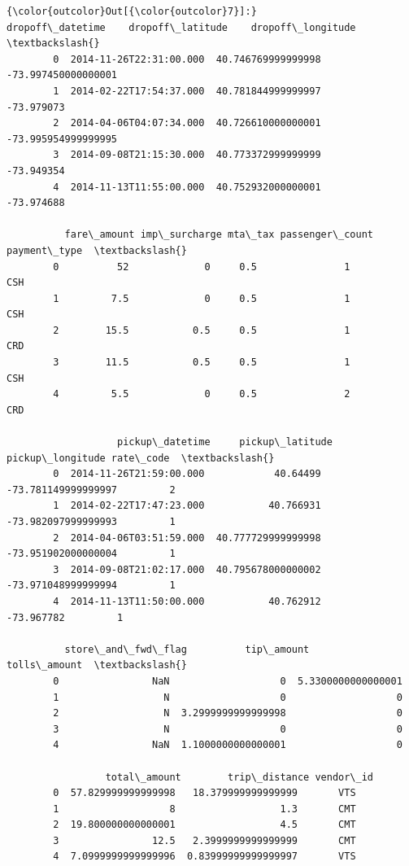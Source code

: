 \documentclass[11pt]{article}
\begin{document}
\begin{Verbatim}[commandchars=\\\{\}]
{\color{outcolor}Out[{\color{outcolor}7}]:}           dropoff\_datetime    dropoff\_latitude    dropoff\_longitude  \textbackslash{}
        0  2014-11-26T22:31:00.000  40.746769999999998  -73.997450000000001   
        1  2014-02-22T17:54:37.000  40.781844999999997           -73.979073   
        2  2014-04-06T04:07:34.000  40.726610000000001  -73.995954999999995   
        3  2014-09-08T21:15:30.000  40.773372999999999           -73.949354   
        4  2014-11-13T11:55:00.000  40.752932000000001           -73.974688   
        
          fare\_amount imp\_surcharge mta\_tax passenger\_count payment\_type  \textbackslash{}
        0          52             0     0.5               1          CSH   
        1         7.5             0     0.5               1          CSH   
        2        15.5           0.5     0.5               1          CRD   
        3        11.5           0.5     0.5               1          CSH   
        4         5.5             0     0.5               2          CRD   
        
                   pickup\_datetime     pickup\_latitude     pickup\_longitude rate\_code  \textbackslash{}
        0  2014-11-26T21:59:00.000            40.64499  -73.781149999999997         2   
        1  2014-02-22T17:47:23.000           40.766931  -73.982097999999993         1   
        2  2014-04-06T03:51:59.000  40.777729999999998  -73.951902000000004         1   
        3  2014-09-08T21:02:17.000  40.795678000000002  -73.971048999999994         1   
        4  2014-11-13T11:50:00.000           40.762912           -73.967782         1   
        
          store\_and\_fwd\_flag          tip\_amount        tolls\_amount  \textbackslash{}
        0                NaN                   0  5.3300000000000001   
        1                  N                   0                   0   
        2                  N  3.2999999999999998                   0   
        3                  N                   0                   0   
        4                NaN  1.1000000000000001                   0   
        
                 total\_amount        trip\_distance vendor\_id  
        0  57.829999999999998   18.379999999999999       VTS  
        1                   8                  1.3       CMT  
        2  19.800000000000001                  4.5       CMT  
        3                12.5   2.3999999999999999       CMT  
        4  7.0999999999999996  0.83999999999999997       VTS  
\end{Verbatim}
            
\end{document}
